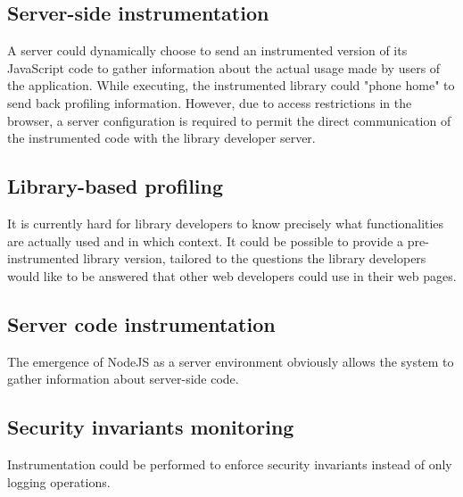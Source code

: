 \subsection{Server-side instrumentation}

A server could dynamically choose to send an instrumented version of its
JavaScript code to gather information about the actual usage made by users of
the application. While executing, the instrumented library could "phone home"
to send back profiling information. However, due to access restrictions in the
browser, a server configuration is required to permit the direct communication
of the instrumented code with the library developer server.

\subsection{Library-based profiling}

It is currently hard for library developers to know precisely what
functionalities are actually used and in which context. It could be possible to
provide a pre-instrumented library version, tailored to the questions the
library developers would like to be answered that other web developers could
use in their web pages. 

\subsection{Server code instrumentation}

The emergence of NodeJS as a server environment obviously allows the system to
gather information about server-side code.

\subsection{Security invariants monitoring}

Instrumentation could be performed to enforce security invariants instead of
only logging operations. 
